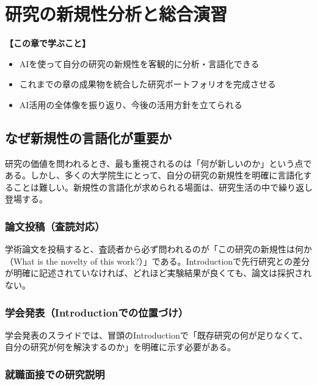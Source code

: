 \chapter{研究の新規性分析と総合演習}
\label{chap10}

\begin{chapterbox}
\textbf{【この章で学ぶこと】}
\begin{itemize}
\item AIを使って自分の研究の新規性を客観的に分析・言語化できる
\item これまでの章の成果物を統合した研究ポートフォリオを完成させる
\item AI活用の全体像を振り返り、今後の活用方針を立てられる
\end{itemize}
\end{chapterbox}
\vspace{5mm}

\section{なぜ新規性の言語化が重要か}

研究の価値を問われるとき、最も重視されるのは「何が新しいのか」という点である。しかし、多くの大学院生にとって、自分の研究の新規性を明確に言語化することは難しい。新規性の言語化が求められる場面は、研究生活の中で繰り返し登場する。

\subsection*{論文投稿（査読対応）}

学術論文を投稿すると、査読者から必ず問われるのが「この研究の新規性は何か（What is the novelty of this work?）」である。Introductionで先行研究との差分が明確に記述されていなければ、どれほど実験結果が良くても、論文は採択されない。

\subsection*{学会発表（Introductionでの位置づけ）}

学会発表のスライドでは、冒頭のIntroductionで「既存研究の何が足りなくて、自分の研究が何を解決するのか」を明確に示す必要がある。

\subsection*{就職面接での研究説明}


